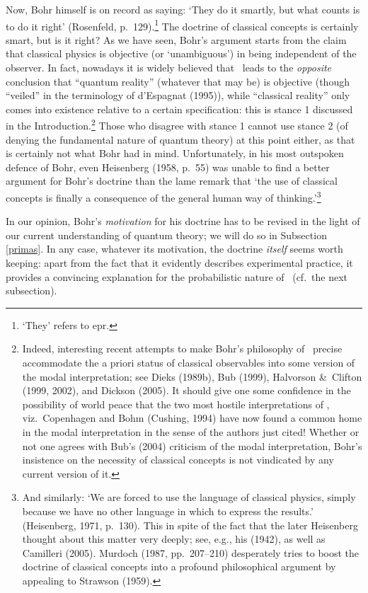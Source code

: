 \documentclass[12pt]{article}
\newcommand{\epr}{{\sc epr}}
\begin{document}
Now,  Bohr himself is on record as saying: `They do it smartly, but what counts is to do it right' (Rosenfeld, p.\ 129).\footnote{`They' refers to \epr.}   
The doctrine of classical concepts is certainly smart, but is it right?
As we have seen, Bohr's argument starts from the claim that  classical physics is objective (or `unambiguous') in being independent of the observer. In fact, nowadays it is widely believed that \qm\ leads to the {\it opposite} conclusion that ``quantum reality'' (whatever that may be) is objective (though ``veiled'' in the terminology of d'Espagnat (1995)), while ``classical reality'' only comes into existence relative to a certain specification: this is stance 1 discussed in the Introduction.\footnote{ Indeed,  interesting recent attempts to make  Bohr's philosophy of \qm\ precise accommodate the a priori status of classical observables into some version of the modal interpretation; see Dieks (1989b), Bub (1999),  Halvorson \&\ Clifton (1999, 2002), and Dickson (2005). It should give one some confidence in the possibility of world peace that the two most hostile interpretations of \qm, viz.\ Copenhagen and Bohm (Cushing, 1994) have now found a common home in the modal interpretation in the sense of the authors just cited! Whether or not one agrees with Bub's (2004) criticism of the modal interpretation, Bohr's insistence on the necessity of classical concepts is not vindicated by any current version  of it.}  
 Those who disagree with stance 1 cannot use stance 2 (of denying the fundamental nature of quantum theory) at this point either, as that is certainly not what Bohr had in mind.
 Unfortunately, in his most outspoken defence of Bohr, even  Heisenberg (1958, p.\ 55) was unable to find a better argument for Bohr's doctrine than the lame remark that `the use of classical concepts is finally a consequence of the general human way of thinking.'\footnote{And similarly: `We are forced to use the language of classical physics, simply because we have no other language in which to express the results.' (Heisenberg, 1971, p.\ 130). This in spite of the fact that the later Heisenberg thought about this matter very deeply; see, e.g., his (1942), as well as Camilleri (2005). Murdoch (1987, pp.\ 207--210) desperately tries to boost the doctrine of classical concepts into a profound philosophical argument by appealing to Strawson (1959).}

In our opinion, Bohr's {\it motivation} for his doctrine has to be revised in the light of our current understanding of quantum theory; we will do so in Subsection \ref{primas}. In any case, whatever its motivation, 
the doctrine {\it itself} seems worth keeping: apart from the fact that it evidently describes experimental practice, it provides a convincing explanation for the probabilistic nature of \qm\ (cf.\ the next subsection). 
\end{document}
